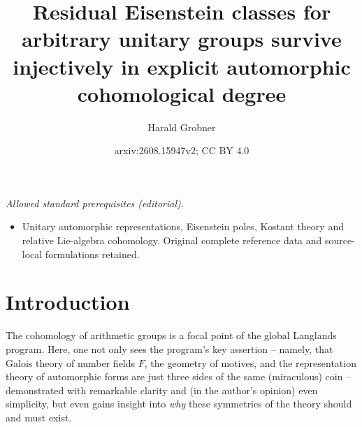 \documentclass[a4paper,10pt]{amsart}
\title{Residual Eisenstein classes for arbitrary unitary groups survive injectively in explicit automorphic cohomological degree}
\author{Harald Grobner}
\date{arxiv:2608.15947v2; CC BY 4.0}
\theoremstyle{definition}
\numberwithin{equation}{section}
\begin{document}
\maketitle
\noindent\textit{Allowed standard prerequisites (editorial).}\begin{itemize}
\item Unitary automorphic representations, Eisenstein poles, Kostant theory and relative Lie-algebra cohomology. Original complete reference data and source-local formulations retained.
\end{itemize}\medskip
\section*{Introduction}

\noindent The cohomology of arithmetic groups is a focal point of the global Langlands program. Here, one not only sees the program's key assertion -- namely, that Galois theory of number fields $F$, the geometry of motives, and the representation theory of automorphic forms are just three sides of the same (miraculous) coin -- demonstrated with remarkable clarity and (in the author's opinion) even simplicity, but even gains insight into {\it why} these symmetries of the theory should and must exist.\\\\
\end{document}
